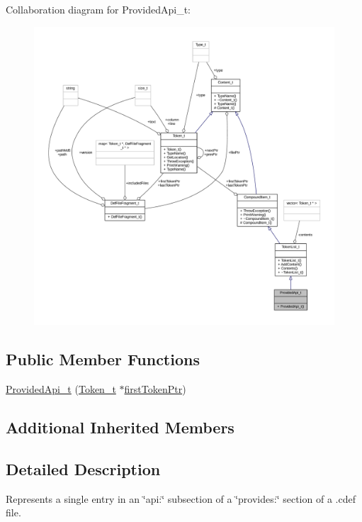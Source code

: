 Collaboration diagram for Provided\+Api\+\_\+t\+:
\nopagebreak
\begin{figure}[H]
\begin{center}
\leavevmode
\includegraphics[width=350pt]{struct_provided_api__t__coll__graph}
\end{center}
\end{figure}
\subsection*{Public Member Functions}
\begin{DoxyCompactItemize}
\item 
\hyperlink{struct_provided_api__t_a557eaa47824a42568fa72db6b7c795ad}{Provided\+Api\+\_\+t} (\hyperlink{struct_token__t}{Token\+\_\+t} $\ast$\hyperlink{struct_compound_item__t_a4d95dc788120f627e332491589d20c5c}{first\+Token\+Ptr})
\end{DoxyCompactItemize}
\subsection*{Additional Inherited Members}


\subsection{Detailed Description}
Represents a single entry in an \char`\"{}api\+:\char`\"{} subsection of a \char`\"{}provides\+:\char`\"{} section of a .cdef file. 

